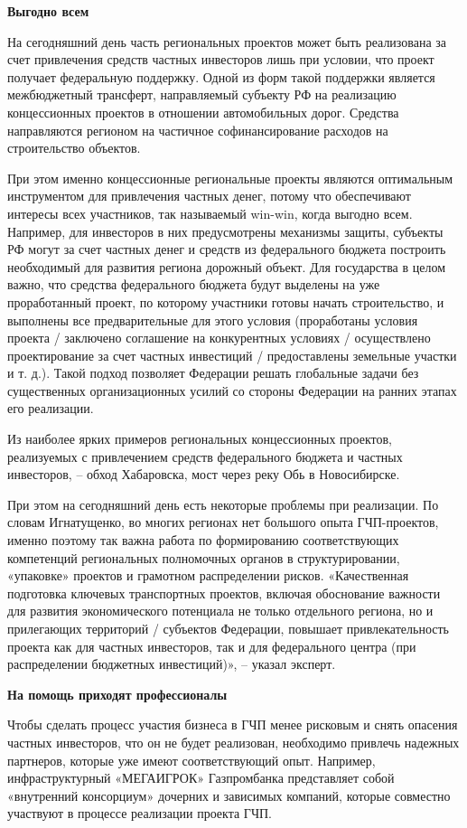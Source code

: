 \textbf{Выгодно всем}

На сегодняшний день часть региональных проектов может быть реализована за счет привлечения средств частных инвесторов лишь при условии, что проект получает федеральную поддержку. Одной из форм такой поддержки является межбюджетный трансферт, направляемый субъекту РФ на реализацию концессионных проектов в отношении автомобильных дорог. Средства направляются регионом на частичное софинансирование расходов на строительство объектов.

При этом именно концессионные региональные проекты являются оптимальным инструментом для привлечения частных денег, потому что обеспечивают интересы всех участников, так называемый win-win, когда выгодно всем. Например, для инвесторов в них предусмотрены механизмы защиты, субъекты РФ могут за счет частных денег и средств из федерального бюджета построить необходимый для развития региона дорожный объект. Для государства в целом важно, что средства федерального бюджета будут выделены на уже проработанный проект, по которому участники готовы начать строительство, и выполнены все предварительные для этого условия (проработаны условия проекта / заключено соглашение на конкурентных условиях / осуществлено проектирование за счет частных инвестиций / предоставлены земельные участки и т. д.). Такой подход позволяет Федерации решать глобальные задачи без существенных организационных усилий со стороны Федерации на ранних этапах его реализации.

Из наиболее ярких примеров региональных концессионных проектов, реализуемых с привлечением средств федерального бюджета и частных инвесторов, – обход Хабаровска, мост через реку Обь в Новосибирске.

При этом на сегодняшний день есть некоторые проблемы при реализации. По словам Игнатущенко, во многих регионах нет большого опыта ГЧП-проектов, именно поэтому так важна работа по формированию соответствующих компетенций региональных полномочных органов в структурировании, «упаковке» проектов и грамотном распределении рисков. «Качественная подготовка ключевых транспортных проектов, включая обоснование важности для развития экономического потенциала не только отдельного региона, но и прилегающих территорий / субъектов Федерации, повышает привлекательность проекта как для частных инвесторов, так и для федерального центра (при распределении бюджетных инвестиций)», – указал эксперт.


\textbf{На помощь приходят профессионалы}

Чтобы сделать процесс участия бизнеса в ГЧП менее рисковым и снять опасения частных инвесторов, что он не будет реализован, необходимо привлечь надежных партнеров, которые уже имеют соответствующий опыт. Например, инфраструктурный «МЕГАИГРОК» Газпромбанка представляет собой «внутренний консорциум» дочерних и зависимых компаний, которые совместно участвуют в процессе реализации проекта ГЧП.

